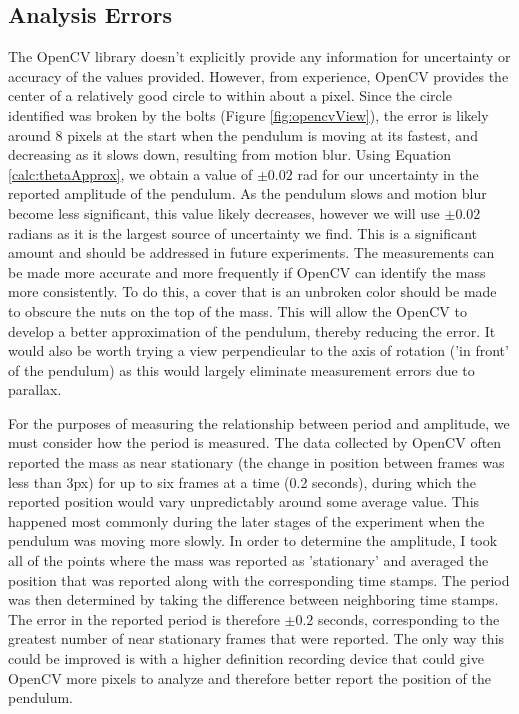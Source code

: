 \documentclass[11pt]{article}
\begin{document}
        \subsection{Analysis Errors}\label{SourcesOfError:AnalysisQFactor}
        The OpenCV library doesn't explicitly provide any information for uncertainty or accuracy of the values provided. However, from experience, OpenCV provides  the center of a relatively good circle to within about a pixel. Since the circle identified was broken by the bolts (Figure \ref{fig:opencvView}), the error is likely around 8 pixels at the start when the pendulum is moving at its fastest, and decreasing as it slows down, resulting from motion blur. Using Equation \ref{calc:thetaApprox}, we obtain a value of $\pm 0.02$ rad for our uncertainty in the reported amplitude of the pendulum. As the pendulum slows and motion blur become less significant, this value likely decreases, however we will use $\pm 0.02$ radians as it is the largest source of uncertainty we find. This is a significant amount and should be addressed in future experiments. The measurements can be made more accurate and more frequently if OpenCV can identify the mass more consistently. To do this, a cover that is an unbroken color should be made to obscure the nuts on the top of the mass. This will allow the OpenCV to develop a better approximation of the pendulum, thereby reducing the error. It would also be worth trying a view perpendicular to the axis of rotation ('in front' of the pendulum) as this would largely eliminate measurement errors due to parallax.

        For the purposes of measuring the relationship between period and amplitude, we must consider how the period is measured. The data collected by OpenCV often reported the mass as near stationary (the change in position between frames was less than 3px) for up to six frames at a time (0.2 seconds), during which the reported position would vary unpredictably around some average value. This happened most commonly during the later stages of the experiment when the pendulum was moving more slowly. In order to determine the amplitude, I took all of the points where the mass was reported as 'stationary' and averaged the position that was reported along with the corresponding time stamps. The period was then determined by taking the difference between neighboring time stamps. The error in the reported period is therefore $\pm 0.2$ seconds, corresponding to the greatest number of near stationary frames that were reported. The only way this could be improved is with a higher definition recording device that could give OpenCV more pixels to analyze and therefore better report the position of the pendulum.
\end{document}
